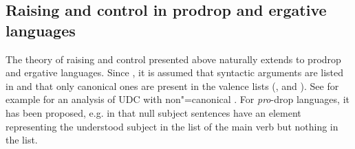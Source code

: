 \documentclass[output=paper
	        ,collection
	        ,collectionchapter
 	        ,biblatex
                ,babelshorthands
                ,newtxmath
                ,draftmode
                ,colorlinks, citecolor=brown
]{langscibook}
\begin{document}



\subsection{Raising and control in prodrop and ergative languages}

The theory of raising and control presented above naturally extends to prodrop and ergative
languages.  Since \citet*{BMS2001a}, it is assumed that syntactic arguments are listed in \argst and
that only canonical ones are present in the valence lists (\subj, \spr and \comps). See for example
 for an analysis of UDC with non"=canonical . For \emph{pro}-drop languages,
it has been proposed, e.g. in \citep[]{ManningandSag1998} that null subject sentences have
an element representing the understood subject in the \argst list of the main verb but nothing in
the \subj list.
\end{document}
